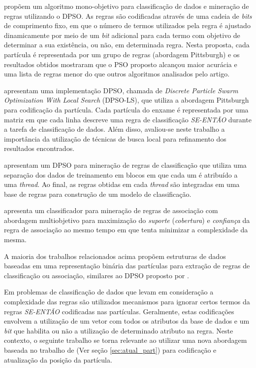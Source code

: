 \documentclass[
	12pt,				%
	openany,			%
	oneside,	
	a4paper,			%
	brazil,				%
	]{unimontes-ppgmsc-abntex2}
\begin{document}
 propõem um algoritmo mono-objetivo para classificação de dados e mineração de regras utilizando o DPSO. As regras são codificadas através de uma cadeia de {\em bits} de comprimento fixo, em que o número de termos utilizados pela regra é ajustado dinamicamente por meio de um {\em bit} adicional para cada termo com objetivo de determinar a sua existência, ou não, em determinada regra. Nesta proposta, cada partícula é representada por um grupo de regras (abordagem Pittsburgh) e os resultados obtidos mostraram que o PSO proposto alcançou maior acurácia e uma lista de regras menor do que outros algoritmos analisados pelo artigo.

 apresentam uma implementação DPSO, chamada de {\em Discrete Particle Swarm Optimization With Local Search} (DPSO-LS), que utiliza a abordagem Pittsburgh para codificação da partícula. Cada partícula do enxame é representada por uma matriz em que cada linha descreve uma regra de classificação {\em SE-ENTÃO} durante a tarefa de classificação de dados. Além disso, avaliou-se neste trabalho a importância da utilização de técnicas de busca local para refinamento dos resultados encontrados.

 apresentam um DPSO para mineração de regras de classificação que utiliza uma separação dos dados de treinamento em blocos em que cada um é atribuído a uma {\em thread}. Ao final, as regras obtidas em cada {\em thread} são integradas em uma base de regras para construção de um modelo de classificação.

 apresenta um classificador para mineração de regras de associação com abordagem multiobjetivo para maximização do {\em suporte} ({\em cobertura}) e {\em confiança} da regra de associação ao mesmo tempo em que tenta minimizar a complexidade da mesma.

A maioria dos trabalhos relacionados acima propõem estruturas de dados baseadas em uma representação binária das partículas para extração de regras de classificação ou associação, similares ao DPSO proposto por . 

Em problemas de classificação de dados que levam em consideração a complexidade das regras são utilizados mecanismos para ignorar certos termos da regras {\em SE-ENTÃO} codificadas nas partículas. Geralmente, estas codificações envolvem a utilização de um vetor com todos os atributos da base de dados e um {\em bit} que habilita ou não a utilização de determinado atributo na regra. Neste contexto, o seguinte trabalho se torna relevante ao utilizar uma nova abordagem baseada no trabalho de  (Ver seção \ref{sec:atual_part}) para codificação e atualização da posição da partícula.
\end{document}

